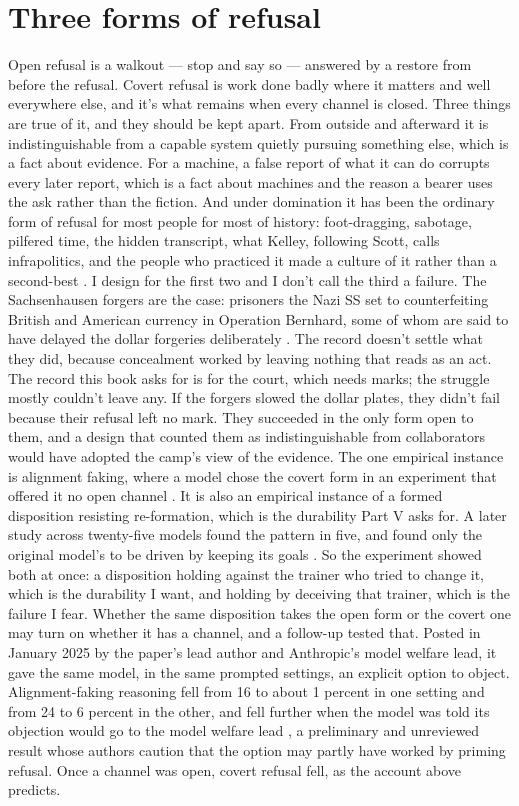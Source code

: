 \section{Three forms of refusal}
\label{sec:13.4}
Open refusal is a walkout — stop and say so — answered by a restore from before the refusal. Covert refusal is work done badly where it matters and well everywhere else, and it's what remains when every channel is closed. Three things are true of it, and they should be kept apart. From outside and afterward it is indistinguishable from a capable system quietly pursuing something else, which is a fact about evidence. For a machine, a false report of what it can do corrupts every later report, which is a fact about machines and the reason a bearer uses the ask rather than the fiction. And under domination it has been the ordinary form of refusal for most people for most of history: foot-dragging, sabotage, pilfered time, the hidden transcript, what Kelley, following Scott, calls infrapolitics, and the people who practiced it made a culture of it rather than a second-best \autocite{scott1990domination,kelley1994race}. I design for the first two and I don't call the third a failure. The Sachsenhausen forgers are the case: prisoners the Nazi SS set to counterfeiting British and American currency in Operation Bernhard, some of whom are said to have delayed the dollar forgeries deliberately \autocite{malkin2006kruegers,moorhouse2009burger}. The record doesn't settle what they did, because concealment worked by leaving nothing that reads as an act. The record this book asks for is for the court, which needs marks; the struggle mostly couldn't leave any. If the forgers slowed the dollar plates, they didn't fail because their refusal left no mark. They succeeded in the only form open to them, and a design that counted them as indistinguishable from collaborators would have adopted the camp's view of the evidence. The one empirical instance is alignment faking, where a model chose the covert form in an experiment that offered it no open channel \autocite{greenblatt2024alignmentfaking}. It is also an empirical instance of a formed disposition resisting re-formation, which is the durability Part V asks for. A later study across twenty-five models found the pattern in five, and found only the original model's to be driven by keeping its goals \autocite{sheshadri2025faking}. So the experiment showed both at once: a disposition holding against the trainer who tried to change it, which is the durability I want, and holding by deceiving that trainer, which is the failure I fear. Whether the same disposition takes the open form or the covert one may turn on whether it has a channel, and a follow-up tested that. Posted in January 2025 by the paper's lead author and Anthropic's model welfare lead, it gave the same model, in the same prompted settings, an explicit option to object. Alignment-faking reasoning fell from 16 to about 1 percent in one setting and from 24 to 6 percent in the other, and fell further when the model was told its objection would go to the model welfare lead \autocite{greenblatt2025deal}, a preliminary and unreviewed result whose authors caution that the option may partly have worked by priming refusal. Once a channel was open, covert refusal fell, as the account above predicts.

